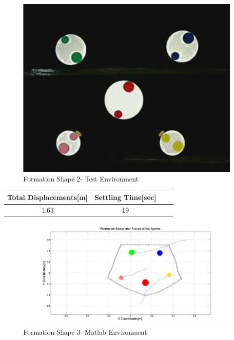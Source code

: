 \begin{figure}[H]
\caption{Formation Shape 2- Test Environment}
\centerline{\includegraphics[scale = 0.35]{4_real_hardware}}
\end{figure} 
					
\begin{center}
 \label{hardwareshape2_ref} 
\begin{tabular}{||c| c |c |c ||}
\hline
\textbf{Total Displacements[m]}  & \textbf{Settling Time[sec]}\\ 
\hline
1.63 & 19 \\
\hline
\end{tabular}
\end{center}
				
\begin{figure}[H]
\caption{Formation Shape 3- Matlab Environment}
\centerline{\includegraphics[scale = 0.32]{5_hardware}}
\end{figure} 
					
